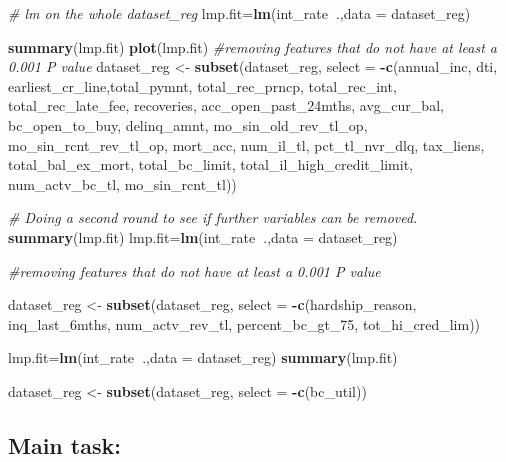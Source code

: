 \documentclass[]{article}
\newenvironment{Shaded}{\begin{snugshade}}{\end{snugshade}}
\newcommand{\CommentTok}[1]{\textcolor[rgb]{0.56,0.35,0.01}{\textit{#1}}}
\newcommand{\DataTypeTok}[1]{\textcolor[rgb]{0.13,0.29,0.53}{#1}}
\newcommand{\DecValTok}[1]{\textcolor[rgb]{0.00,0.00,0.81}{#1}}
\newcommand{\KeywordTok}[1]{\textcolor[rgb]{0.13,0.29,0.53}{\textbf{#1}}}
\newcommand{\NormalTok}[1]{#1}
\newcommand{\OperatorTok}[1]{\textcolor[rgb]{0.81,0.36,0.00}{\textbf{#1}}}
\newcommand{\StringTok}[1]{\textcolor[rgb]{0.31,0.60,0.02}{#1}}
\begin{document}
\begin{Shaded}
\begin{Highlighting}[]
\CommentTok{# lm on the whole dataset_reg}
\NormalTok{lmp.fit=}\KeywordTok{lm}\NormalTok{(int_rate}\OperatorTok{~}\NormalTok{.,}\DataTypeTok{data =}\NormalTok{ dataset_reg)}

\KeywordTok{summary}\NormalTok{(lmp.fit)}
\KeywordTok{plot}\NormalTok{(lmp.fit)}
\CommentTok{#removing features that do not have at least a 0.001 P value}
\NormalTok{dataset_reg <-}\StringTok{ }\KeywordTok{subset}\NormalTok{(dataset_reg, }\DataTypeTok{select =} \OperatorTok{-}\KeywordTok{c}\NormalTok{(annual_inc, dti, earliest_cr_line,total_pymnt, total_rec_prncp, total_rec_int, total_rec_late_fee, recoveries, acc_open_past_24mths, avg_cur_bal, bc_open_to_buy, delinq_amnt, mo_sin_old_rev_tl_op, mo_sin_rcnt_rev_tl_op, mort_acc, num_il_tl, pct_tl_nvr_dlq, tax_liens, total_bal_ex_mort, total_bc_limit, total_il_high_credit_limit, num_actv_bc_tl, mo_sin_rcnt_tl))}

\CommentTok{# Doing a second round to see if further variables can be removed.}
\KeywordTok{summary}\NormalTok{(lmp.fit)}
\NormalTok{lmp.fit=}\KeywordTok{lm}\NormalTok{(int_rate}\OperatorTok{~}\NormalTok{.,}\DataTypeTok{data =}\NormalTok{ dataset_reg)}

\CommentTok{#removing features that do not have at least a 0.001 P value}

\NormalTok{dataset_reg <-}\StringTok{ }\KeywordTok{subset}\NormalTok{(dataset_reg, }\DataTypeTok{select =} \OperatorTok{-}\KeywordTok{c}\NormalTok{(hardship_reason, inq_last_6mths, num_actv_rev_tl, percent_bc_gt_}\DecValTok{75}\NormalTok{, tot_hi_cred_lim))}
                  
\NormalTok{lmp.fit=}\KeywordTok{lm}\NormalTok{(int_rate}\OperatorTok{~}\NormalTok{.,}\DataTypeTok{data =}\NormalTok{ dataset_reg)}
\KeywordTok{summary}\NormalTok{(lmp.fit)}

\NormalTok{dataset_reg <-}\StringTok{ }\KeywordTok{subset}\NormalTok{(dataset_reg, }\DataTypeTok{select =} \OperatorTok{-}\KeywordTok{c}\NormalTok{(bc_util))}
\end{Highlighting}
\end{Shaded}

\pagebreak

\hypertarget{main-task}{%
\subsection{Main task:}\label{main-task}}
\end{document}
